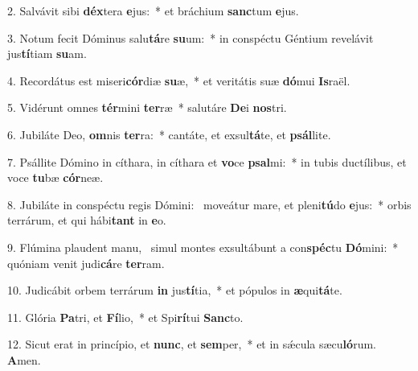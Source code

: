 2. Salvávit sibi \textbf{déx}tera \textbf{e}jus:~*  et bráchium \textbf{sanc}tum \textbf{e}jus.\

3. Notum fecit Dóminus salu\textbf{tá}re \textbf{su}um:~*  in conspéctu Géntium revelávit jus\textbf{tí}tiam \textbf{su}am.\

4. Recordátus est miseri\textbf{cór}diæ \textbf{su}æ,~*  et veritátis suæ \textbf{dó}mui \textbf{Is}raël.\

5. Vidérunt omnes \textbf{tér}mini \textbf{ter}ræ~*  salutáre \textbf{De}i \textbf{nos}tri.\

6. Jubiláte Deo, \textbf{om}nis \textbf{ter}ra:~*  cantáte, et exsul\textbf{tá}te, et \textbf{psál}lite.\

7. Psállite Dómino in cíthara, in cíthara et \textbf{vo}ce \textbf{psal}mi:~*  in tubis ductílibus, et voce \textbf{tu}bæ \textbf{cór}neæ.\

8. Jubiláte in conspéctu regis Dómini: \dag\  moveátur mare, et pleni\textbf{tú}do \textbf{e}jus:~*  orbis terrárum, et qui hábi\textbf{tant} in \textbf{e}o.\

9. Flúmina plaudent manu, \dag\  simul montes exsultábunt a con\textbf{spéc}tu \textbf{Dó}mini:~*  quóniam venit judi\textbf{cá}re \textbf{ter}ram.\

10. Judicábit orbem terrárum \textbf{in} jus\textbf{tí}tia,~*  et pópulos in \textbf{æ}qui\textbf{tá}te.\

11. Glória \textbf{Pa}tri, et \textbf{Fí}lio,~*  et Spi\textbf{rí}tui \textbf{Sanc}to.\

12. Sicut erat in princípio, et \textbf{nunc}, et \textbf{sem}per,~*  et in sǽcula sæcu\textbf{ló}rum. \textbf{A}men.\

